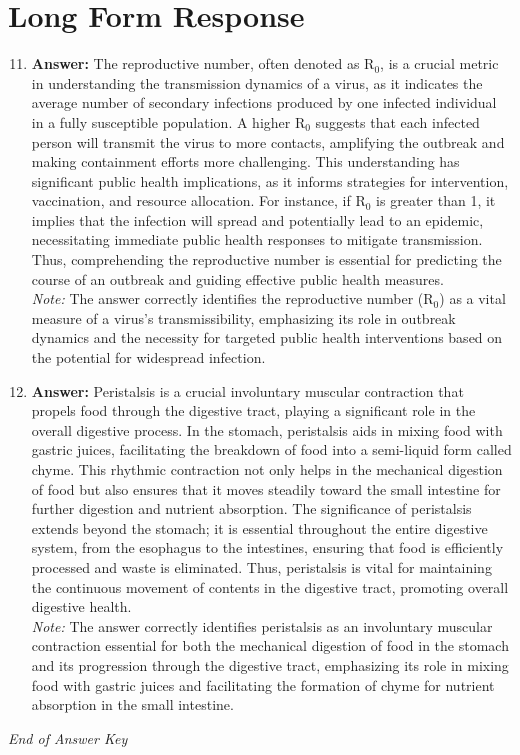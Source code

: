 \documentclass[12pt]{article}
\begin{document}
\section*{Long Form Response}
\begin{enumerate}[label=\arabic*.]
\setcounter{enumi}{10}
\item \textbf{Answer:} The reproductive number, often denoted as R$_{0}$, is a crucial metric in understanding the transmission dynamics of a virus, as it indicates the average number of secondary infections produced by one infected individual in a fully susceptible population. A higher R$_{0}$ suggests that each infected person will transmit the virus to more contacts, amplifying the outbreak and making containment efforts more challenging. This understanding has significant public health implications, as it informs strategies for intervention, vaccination, and resource allocation. For instance, if R$_{0}$ is greater than 1, it implies that the infection will spread and potentially lead to an epidemic, necessitating immediate public health responses to mitigate transmission. Thus, comprehending the reproductive number is essential for predicting the course of an outbreak and guiding effective public health measures.
\\ \textit{Note:} The answer correctly identifies the reproductive number (R$_{0}$) as a vital measure of a virus's transmissibility, emphasizing its role in outbreak dynamics and the necessity for targeted public health interventions based on the potential for widespread infection.
\item \textbf{Answer:} Peristalsis is a crucial involuntary muscular contraction that propels food through the digestive tract, playing a significant role in the overall digestive process. In the stomach, peristalsis aids in mixing food with gastric juices, facilitating the breakdown of food into a semi-liquid form called chyme. This rhythmic contraction not only helps in the mechanical digestion of food but also ensures that it moves steadily toward the small intestine for further digestion and nutrient absorption. The significance of peristalsis extends beyond the stomach; it is essential throughout the entire digestive system, from the esophagus to the intestines, ensuring that food is efficiently processed and waste is eliminated. Thus, peristalsis is vital for maintaining the continuous movement of contents in the digestive tract, promoting overall digestive health.
\\ \textit{Note:} The answer correctly identifies peristalsis as an involuntary muscular contraction essential for both the mechanical digestion of food in the stomach and its progression through the digestive tract, emphasizing its role in mixing food with gastric juices and facilitating the formation of chyme for nutrient absorption in the small intestine.
\end{enumerate}

\vfill
\noindent\textit{End of Answer Key}
\end{document}
